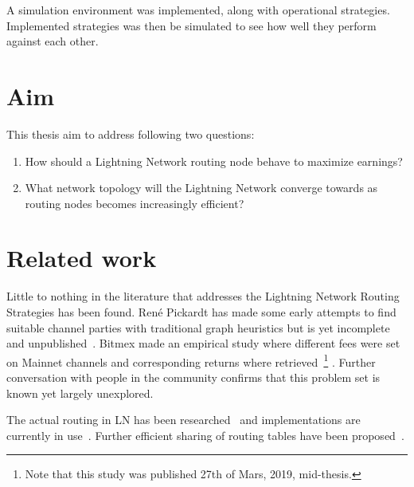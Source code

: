 A simulation environment was implemented, along with operational strategies. Implemented strategies was then be simulated to see how well they perform against each other.

\section{Aim}
    \label{sec:aim}

This thesis aim to address following two questions:

	\begin{enumerate}
		\item How should a \gls{Lightning Network} routing node behave to maximize earnings?
	
		\item What network topology will the \gls{Lightning Network} converge towards as routing nodes becomes increasingly efficient?
		
		
	\end{enumerate}
	
\section{Related work}
    \label{sec:related_work}

	Little to nothing in the literature that addresses the Lightning Network Routing Strategies has been found. René Pickardt has made some early attempts to find suitable channel parties with traditional graph heuristics but is yet incomplete and unpublished~\cite{repository:rene:pickard}. Bitmex made an empirical study where different fees were set on Mainnet channels and corresponding returns where retrieved~\cite{bitmex:fee}\footnote{Note that this study was published 27th of Mars, 2019, mid-thesis.} . Further conversation with people in the community confirms that this problem set is known yet largely unexplored.
	
	The actual routing in LN has been researched~\cite{distasi:avallone:cononico:routing} and implementations are currently in use~\cite{repository:clightning, repository:lnd, repository:eclair, repository:lit}. Further efficient sharing of routing tables have been proposed~\cite{gunspan:marco:ant}.
	
